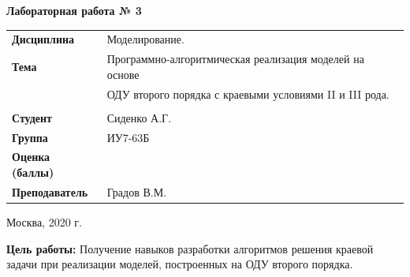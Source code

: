 \documentclass[a4paper,14pt]{extreport} %
\begin{document}
\begin{titlepage}
    \vspace{2cm}

    \begin{center}
        \textbf{Лабораторная работа № 3} \\
        \vspace{0.5cm}
    \end{center}

    \vspace{4cm}

    \begin{flushleft}
        \begin{tabular}{ll}
            \textbf{Дисциплина} & Моделирование.  \\
            \textbf{Тема} & Программно-алгоритмическая реализация моделей на основе  \\
            & ОДУ второго порядка с краевыми условиями II и  III рода. \\
            \\
            \textbf{Студент} & Сиденко А.Г. \\
            \textbf{Группа} & ИУ7-63Б \\
            \textbf{Оценка (баллы)} & \\
            \textbf{Преподаватель} & Градов В.М.   \\
        \end{tabular}
    \end{flushleft}

    \vspace{4cm}

   \begin{center}
        Москва, 2020 г.
    \end{center}

\end{titlepage}

\textbf{Цель работы:} Получение навыков разработки алгоритмов решения краевой задачи при реализации моделей, построенных на ОДУ второго порядка.
\end{document}
